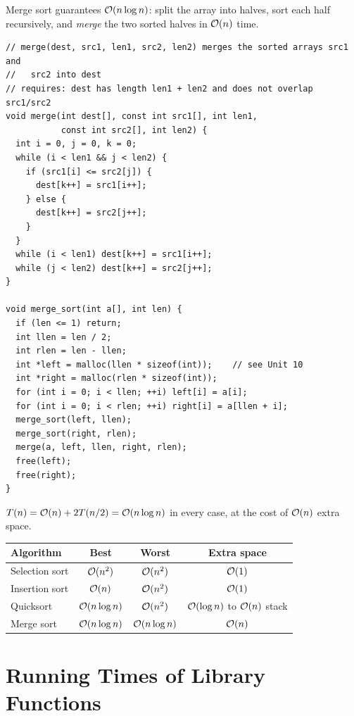 Merge sort guarantees $\mathcal{O}(n \log n)$: split the array into halves, sort each half recursively,
and \emph{merge} the two sorted halves in $\mathcal{O}(n)$ time.
\begin{lstlisting}[style=c]
// merge(dest, src1, len1, src2, len2) merges the sorted arrays src1 and
//   src2 into dest
// requires: dest has length len1 + len2 and does not overlap src1/src2
void merge(int dest[], const int src1[], int len1,
           const int src2[], int len2) {
  int i = 0, j = 0, k = 0;
  while (i < len1 && j < len2) {
    if (src1[i] <= src2[j]) {
      dest[k++] = src1[i++];
    } else {
      dest[k++] = src2[j++];
    }
  }
  while (i < len1) dest[k++] = src1[i++];
  while (j < len2) dest[k++] = src2[j++];
}

void merge_sort(int a[], int len) {
  if (len <= 1) return;
  int llen = len / 2;
  int rlen = len - llen;
  int *left = malloc(llen * sizeof(int));    // see Unit 10
  int *right = malloc(rlen * sizeof(int));
  for (int i = 0; i < llen; ++i) left[i] = a[i];
  for (int i = 0; i < rlen; ++i) right[i] = a[llen + i];
  merge_sort(left, llen);
  merge_sort(right, rlen);
  merge(a, left, llen, right, rlen);
  free(left);
  free(right);
}
\end{lstlisting}
$T(n) = \mathcal{O}(n) + 2T(n/2) = \mathcal{O}(n \log n)$ in every case, at the cost of $\mathcal{O}(n)$ extra space.

\begin{center}
\begin{tabular}{lccc}
  \toprule
  Algorithm & Best & Worst & Extra space \\
  \midrule
  Selection sort & $\mathcal{O}(n^2)$ & $\mathcal{O}(n^2)$ & $\mathcal{O}(1)$ \\
  Insertion sort & $\mathcal{O}(n)$ & $\mathcal{O}(n^2)$ & $\mathcal{O}(1)$ \\
  Quicksort & $\mathcal{O}(n \log n)$ & $\mathcal{O}(n^2)$ & $\mathcal{O}(\log n)$ to $\mathcal{O}(n)$ stack \\
  Merge sort & $\mathcal{O}(n \log n)$ & $\mathcal{O}(n \log n)$ & $\mathcal{O}(n)$ \\
  \bottomrule
\end{tabular}
\end{center}

\section{Running Times of Library Functions}

